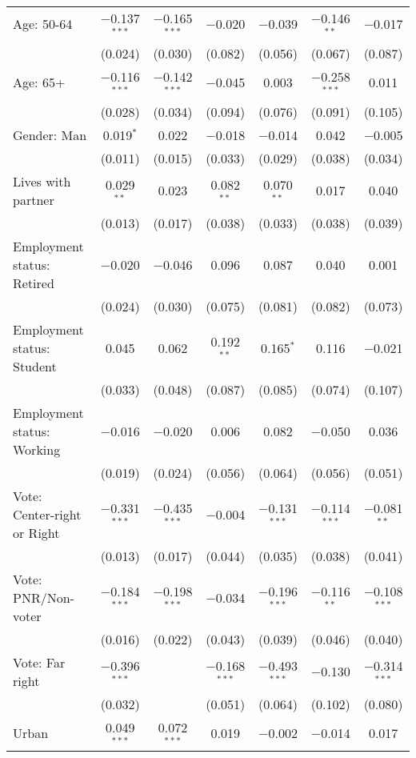 \begin{tabular}{@{\extracolsep{5pt}}lcccccc}
  Age: 50-64 & $-$0.137$^{***}$ & $-$0.165$^{***}$ & $-$0.020 & $-$0.039 & $-$0.146$^{**}$ & $-$0.017 \\ 
  & (0.024) & (0.030) & (0.082) & (0.056) & (0.067) & (0.087) \\ 
  Age: 65+ & $-$0.116$^{***}$ & $-$0.142$^{***}$ & $-$0.045 & 0.003 & $-$0.258$^{***}$ & 0.011 \\ 
  & (0.028) & (0.034) & (0.094) & (0.076) & (0.091) & (0.105) \\ 
  Gender: Man & 0.019$^{*}$ & 0.022 & $-$0.018 & $-$0.014 & 0.042 & $-$0.005 \\ 
  & (0.011) & (0.015) & (0.033) & (0.029) & (0.038) & (0.034) \\ 
  Lives with partner & 0.029$^{**}$ & 0.023 & 0.082$^{**}$ & 0.070$^{**}$ & 0.017 & 0.040 \\ 
  & (0.013) & (0.017) & (0.038) & (0.033) & (0.038) & (0.039) \\ 
  Employment status: Retired & $-$0.020 & $-$0.046 & 0.096 & 0.087 & 0.040 & 0.001 \\ 
  & (0.024) & (0.030) & (0.075) & (0.081) & (0.082) & (0.073) \\ 
  Employment status: Student & 0.045 & 0.062 & 0.192$^{**}$ & 0.165$^{*}$ & 0.116 & $-$0.021 \\ 
  & (0.033) & (0.048) & (0.087) & (0.085) & (0.074) & (0.107) \\ 
  Employment status: Working & $-$0.016 & $-$0.020 & 0.006 & 0.082 & $-$0.050 & 0.036 \\ 
  & (0.019) & (0.024) & (0.056) & (0.064) & (0.056) & (0.051) \\ 
  Vote: Center-right or Right & $-$0.331$^{***}$ & $-$0.435$^{***}$ & $-$0.004 & $-$0.131$^{***}$ & $-$0.114$^{***}$ & $-$0.081$^{**}$ \\ 
  & (0.013) & (0.017) & (0.044) & (0.035) & (0.038) & (0.041) \\ 
  Vote: PNR/Non-voter & $-$0.184$^{***}$ & $-$0.198$^{***}$ & $-$0.034 & $-$0.196$^{***}$ & $-$0.116$^{**}$ & $-$0.108$^{***}$ \\ 
  & (0.016) & (0.022) & (0.043) & (0.039) & (0.046) & (0.040) \\ 
  Vote: Far right & $-$0.396$^{***}$ &  & $-$0.168$^{***}$ & $-$0.493$^{***}$ & $-$0.130 & $-$0.314$^{***}$ \\ 
  & (0.032) &  & (0.051) & (0.064) & (0.102) & (0.080) \\ 
  Urban & 0.049$^{***}$ & 0.072$^{***}$ & 0.019 & $-$0.002 & $-$0.014 & 0.017 \\ 

\end{tabular}

